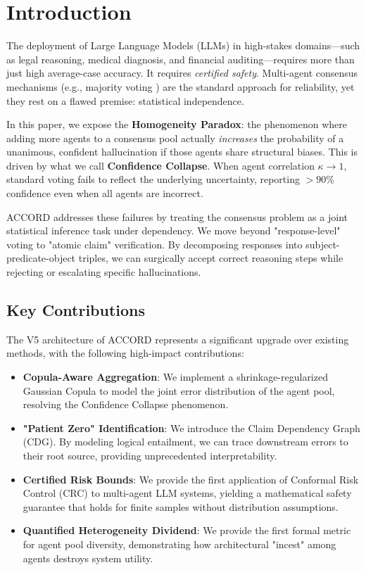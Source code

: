 \documentclass[conference]{IEEEtran}
\begin{document}
\section{Introduction}

The deployment of Large Language Models (LLMs) in high-stakes domains—such as legal reasoning, medical diagnosis, and financial auditing—requires more than just high average-case accuracy. It requires \textit{certified safety}. Multi-agent consensus mechanisms (e.g., majority voting \cite{wang2022selfconsistency}) are the standard approach for reliability, yet they rest on a flawed premise: statistical independence.

In this paper, we expose the \textbf{Homogeneity Paradox}: the phenomenon where adding more agents to a consensus pool actually \textit{increases} the probability of a unanimous, confident hallucination if those agents share structural biases. This is driven by what we call \textbf{Confidence Collapse}. When agent correlation $\kappa \to 1$, standard voting fails to reflect the underlying uncertainty, reporting $>90\%$ confidence even when all agents are incorrect.

ACCORD addresses these failures by treating the consensus problem as a joint statistical inference task under dependency. We move beyond "response-level" voting to "atomic claim" verification. By decomposing responses into subject-predicate-object triples, we can surgically accept correct reasoning steps while rejecting or escalating specific hallucinations.

\subsection{Key Contributions}
The V5 architecture of ACCORD represents a significant upgrade over existing methods, with the following high-impact contributions:
\begin{itemize}
    \item \textbf{Copula-Aware Aggregation}: We implement a shrinkage-regularized Gaussian Copula to model the joint error distribution of the agent pool, resolving the Confidence Collapse phenomenon.
    \item \textbf{"Patient Zero" Identification}: We introduce the Claim Dependency Graph (CDG). By modeling logical entailment, we can trace downstream errors to their root source, providing unprecedented interpretability.
    \item \textbf{Certified Risk Bounds}: We provide the first application of Conformal Risk Control (CRC) to multi-agent LLM systems, yielding a mathematical safety guarantee that holds for finite samples without distribution assumptions.
    \item \textbf{Quantified Heterogeneity Dividend}: We provide the first formal metric for agent pool diversity, demonstrating how architectural "incest" among agents destroys system utility.
\end{itemize}
\end{document}
